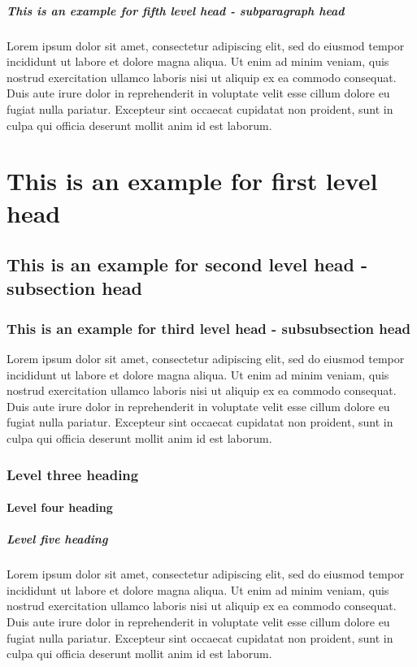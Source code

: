 \documentclass[unnumsec,webpdf,contemporary,large]{oup-authoring-template}%
\theoremstyle{thmstyleone}%
\theoremstyle{thmstyletwo}%
\theoremstyle{thmstylethree}%
\begin{document}
\subparagraph{This is an example for fifth level head - subparagraph head}

Lorem ipsum dolor sit amet, consectetur adipiscing elit, sed do eiusmod tempor incididunt ut labore et dolore magna aliqua. Ut enim ad minim veniam, quis nostrud exercitation ullamco laboris nisi ut aliquip ex ea commodo consequat. Duis aute irure dolor in reprehenderit in voluptate velit esse cillum dolore eu fugiat nulla pariatur. Excepteur sint occaecat cupidatat non proident, sunt in culpa qui officia deserunt mollit anim id est laborum.

\section{This is an example for first level head}\label{sec3}

\subsection{This is an example for second level head - subsection head}\label{subsec2}

\subsubsection{This is an example for third level head - subsubsection head}\label{subsubsec2}

Lorem ipsum dolor sit amet, consectetur adipiscing elit, sed do eiusmod tempor incididunt ut labore et dolore magna aliqua. Ut enim ad minim veniam, quis nostrud exercitation ullamco laboris nisi ut aliquip ex ea commodo consequat. Duis aute irure dolor in reprehenderit in voluptate velit esse cillum dolore eu fugiat nulla pariatur. Excepteur sint occaecat cupidatat non proident, sunt in culpa qui officia deserunt mollit anim id est laborum.

\subsubsection{Level three heading}

\paragraph{Level four heading}

\subparagraph{Level five heading}

Lorem ipsum dolor sit amet, consectetur adipiscing elit, sed do eiusmod tempor incididunt ut labore et dolore magna aliqua. Ut enim ad minim veniam, quis nostrud exercitation ullamco laboris nisi ut aliquip ex ea commodo consequat. Duis aute irure dolor in reprehenderit in voluptate velit esse cillum dolore eu fugiat nulla pariatur. Excepteur sint occaecat cupidatat non proident, sunt in culpa qui officia deserunt mollit anim id est laborum.
\end{document}
